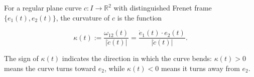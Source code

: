 For a regular plane curve $c: I \to \mathbb{R}^2$ with distinguished Frenet frame $\{e_1(t), e_2(t)\}$, the curvature of $c$ is the function

$$\kappa(t) := \frac{\omega_{12}(t)}{|\dot{c}(t)|} = \frac{\dot{e}_1(t) \cdot e_2(t)}{|\dot{c}(t)|}.$$

The sign of $\kappa(t)$ indicates the direction in which the curve bends: $\kappa(t) > 0$ means the curve turns toward $e_2$, while $\kappa(t) < 0$ means it turns away from $e_2$.
